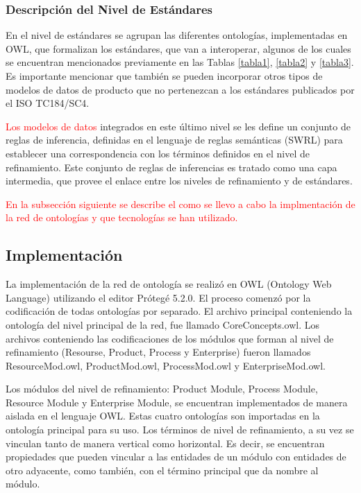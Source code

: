 \documentclass[journal]{IEEEtran}
\begin{document}
\subsubsection{Descripci\'on del Nivel de Est\'andares}

En el nivel de est\'andares se agrupan las diferentes ontolog\'ias, implementadas en OWL, que formalizan los est\'andares, que van a interoperar, algunos de los cuales se encuentran mencionados previamente en las Tablas \ref{tabla1}, \ref{tabla2} y \ref{tabla3}. Es importante mencionar que tambi\'en se pueden incorporar otros tipos de modelos de datos de producto que no pertenezcan a los est\'andares publicados por el ISO TC184/SC4.  

\textcolor{red}{Los modelos de datos} integrados en este \'ultimo nivel se les define un conjunto de reglas de inferencia, definidas en el lenguaje de reglas sem\'anticas (SWRL) para establecer una correspondencia con los t\'erminos definidos en el nivel de refinamiento. Este conjunto de reglas de inferencias es tratado como una capa intermedia, que provee el enlace entre los niveles de refinamiento y de est\'andares. 


\textcolor{red}{En la subsecci\'on siguiente se describe el como se llevo a cabo la implmentaci\'on de la red de ontolog\'ias y que tecnolog\'ias se han utilizado.}

\subsection{Implementaci\'on}

La implementaci\'on de la red de ontolog\'ia se realiz\'o en OWL (Ontology Web Language) utilizando el editor Pr\'oteg\'e 5.2.0. El proceso comenz\'o por la codificaci\'on de todas ontolog\'ias por separado. El archivo principal conteniendo la ontolog\'ia del nivel principal de la red, fue llamado CoreConcepts.owl. Los archivos conteniendo las codificaciones de los m\'odulos que forman al nivel de refinamiento (Resourse, Product, Process y Enterprise) fueron llamados ResourceMod.owl, ProductMod.owl, ProcessMod.owl y EnterpriseMod.owl. 

Los m\'odulos del nivel de refinamiento: Product Module, Process Module, Resource Module y Enterprise Module, se encuentran implementados de manera aislada en el lenguaje OWL. Estas cuatro ontolog\'ias son importadas en la ontolog\'ia   principal para su uso. Los t\'erminos de nivel de refinamiento, a su vez se vinculan tanto de manera vertical como horizontal. Es decir, se encuentran propiedades que pueden vincular a las entidades de un m\'odulo con entidades de otro adyacente, como tambi\'en, con el t\'ermino principal que da nombre al m\'odulo. 
\end{document}
